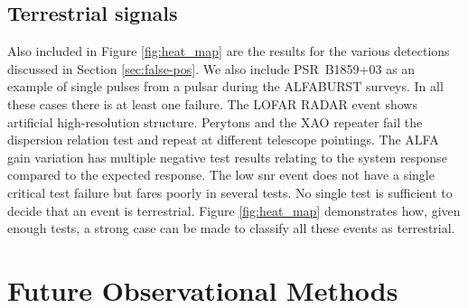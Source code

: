 \documentclass[a4paper,fleqn,usenatbib]{mnras}
\newcommand{\cM}[1]{\textcolor{magenta}{ #1 --M}}
\begin{document}
%

\subsection{Terrestrial signals}

Also included in Figure \ref{fig:heat_map} are the results for the various
detections discussed in Section \ref{sec:false-pos}. We also include
PSR~B1859+03 as an example of single pulses from a pulsar during the ALFABURST
surveys.  In all these cases there is at least one failure.  The LOFAR RADAR
event shows artificial high-resolution structure.  Perytons and the XAO repeater
fail the dispersion relation test and repeat at different telescope pointings.
The ALFA gain variation has multiple negative test results relating to the
system response compared to the expected response.  The low \gls{snr} event does
not have a single critical test failure but fares poorly in several tests.  No
single test is sufficient to decide that an event is terrestrial. Figure
\ref{fig:heat_map} demonstrates how, given enough tests, a strong case can be
made to classify all these events as terrestrial.

\section{Future Observational Methods}
\label{sec:future_methods}
\end{document}
